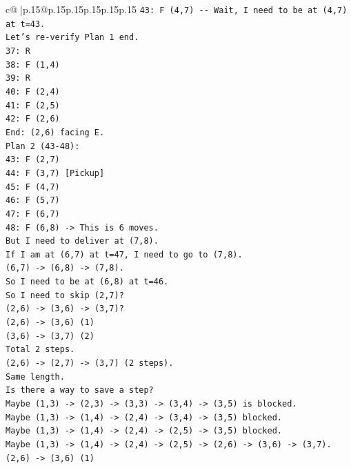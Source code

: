 \documentclass{article}
\begin{document}
{\begin{supertabular}{c@{$\;$}|p{.15\linewidth}@{}p{.15\linewidth}p{.15\linewidth}p{.15\linewidth}p{.15\linewidth}p{.15\linewidth}}
{{{\texttt{43: F (4,7) {-}{-} Wait, I need to be at (4,7) at t=43.} \\
\texttt{Let's re{-}verify Plan 1 end.} \\
\texttt{37: R} \\
\texttt{38: F (1,4)} \\
\texttt{39: R} \\
\texttt{40: F (2,4)} \\
\texttt{41: F (2,5)} \\
\texttt{42: F (2,6)} \\
\texttt{End: (2,6) facing E.} \\
\texttt{Plan 2 (43{-}48):} \\
\texttt{43: F (2,7)} \\
\texttt{44: F (3,7) {[}Pickup{]}} \\
\texttt{45: F (4,7)} \\
\texttt{46: F (5,7)} \\
\texttt{47: F (6,7)} \\
\texttt{48: F (6,8) {-}> This is 6 moves.} \\
\texttt{But I need to deliver at (7,8).} \\
\texttt{If I am at (6,7) at t=47, I need to go to (7,8).} \\
\texttt{(6,7) {-}> (6,8) {-}> (7,8).} \\
\texttt{So I need to be at (6,8) at t=46.} \\
\texttt{So I need to skip (2,7)?} \\
\texttt{(2,6) {-}> (3,6) {-}> (3,7)?} \\
\texttt{(2,6) {-}> (3,6) (1)} \\
\texttt{(3,6) {-}> (3,7) (2)} \\
\texttt{Total 2 steps.} \\
\texttt{(2,6) {-}> (2,7) {-}> (3,7) (2 steps).} \\
\texttt{Same length.} \\
\texttt{Is there a way to save a step?} \\
\texttt{Maybe (1,3) {-}> (2,3) {-}> (3,3) {-}> (3,4) {-}> (3,5) is blocked.} \\
\texttt{Maybe (1,3) {-}> (1,4) {-}> (2,4) {-}> (3,4) {-}> (3,5) blocked.} \\
\texttt{Maybe (1,3) {-}> (1,4) {-}> (2,4) {-}> (2,5) {-}> (3,5) blocked.} \\
\texttt{Maybe (1,3) {-}> (1,4) {-}> (2,4) {-}> (2,5) {-}> (2,6) {-}> (3,6) {-}> (3,7).} \\
\texttt{(2,6) {-}> (3,6) (1)} \\
}}}
\end{supertabular}}
\end{document}

